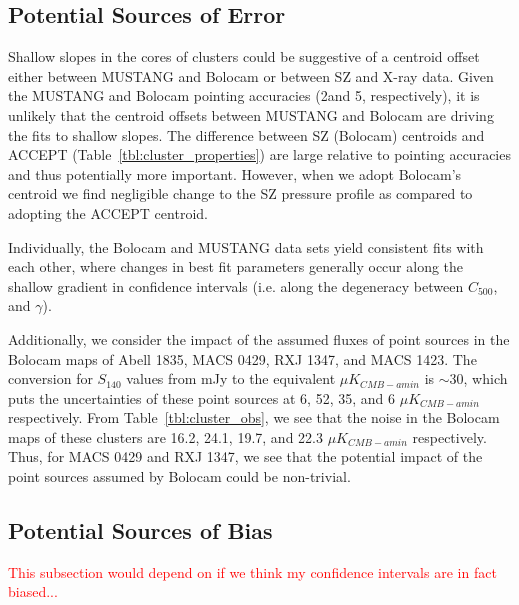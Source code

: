 \documentclass[iop,numberedappendix,apj]{emulateapj}
\begin{document}
\subsection{Potential Sources of Error}
\label{sec:pp_error}

Shallow slopes in the cores of clusters could be suggestive of a centroid offset either between MUSTANG and Bolocam or
between SZ and X-ray data. Given the MUSTANG and Bolocam pointing accuracies (2\asec and 5\asec, respectively),
it is unlikely that the centroid offsets between MUSTANG and Bolocam are driving the fits to shallow slopes. 
The difference between
SZ (Bolocam) centroids and ACCEPT (Table~\ref{tbl:cluster_properties}) are large relative to pointing accuracies
and thus potentially more important. However, when we adopt Bolocam's centroid 
we find negligible change to the SZ pressure profile as compared to adopting the ACCEPT centroid. 

Individually, the Bolocam and MUSTANG data sets yield consistent fits with each other, where changes in best fit 
parameters generally occur along the shallow gradient in confidence intervals (i.e. along the degeneracy
between  $C_{500}$, and $\gamma$).

Additionally, we consider the impact of the assumed fluxes of point sources in the Bolocam maps of Abell 1835, 
MACS 0429, RXJ 1347, and MACS 1423. The conversion for $S_{140}$ values from mJy to the equivalent $\mu K_{CMB-amin}$ 
is $\sim 30$, which puts the uncertainties of these point sources at 6, 52, 35, and 6 $\mu K_{CMB-amin}$ respectively. 
From Table~\ref{tbl:cluster_obs}, we see that the noise in the Bolocam maps of these clusters are 16.2, 24.1, 19.7, 
and 22.3 $\mu K_{CMB-amin}$ respectively. Thus, for MACS 0429 and RXJ 1347, we see that the potential impact of the
point sources assumed by Bolocam could be non-trivial.

\subsection{Potential Sources of Bias}
\label{sec:pp_bias}

\textcolor{red}{This subsection would depend on if we think my confidence intervals are in fact biased...}
\end{document}
